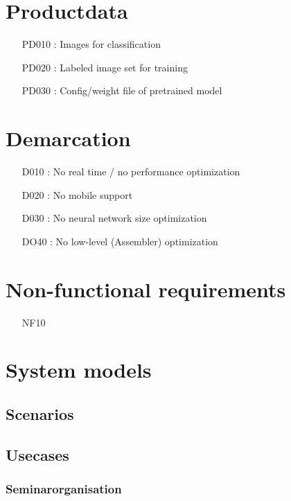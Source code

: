 \documentclass[parskip=full]{scrartcl}
\begin{document}
\section{Productdata}
\begin{itemize}[nosep]
\item [PD010]: Images for classification
\item [PD020]: Labeled image set for training
\item [PD030]: Config/weight file of pretrained model
\end{itemize}

\section{Demarcation}
\begin{itemize}[nosep]
\item [D010]: No real time / no performance optimization
\item [D020]: No mobile support
\item [D030]: No neural network size optimization
\item [DO40]: No low-level (Assembler) optimization
\end{itemize}

\section{Non-functional requirements}
\begin{itemize}[nosep]
\item[NF10] 
\end{itemize}

\section{System models}

\subsection{Scenarios}
\subsection{Usecases}
\subsubsection{Seminarorganisation}
\end{document}
